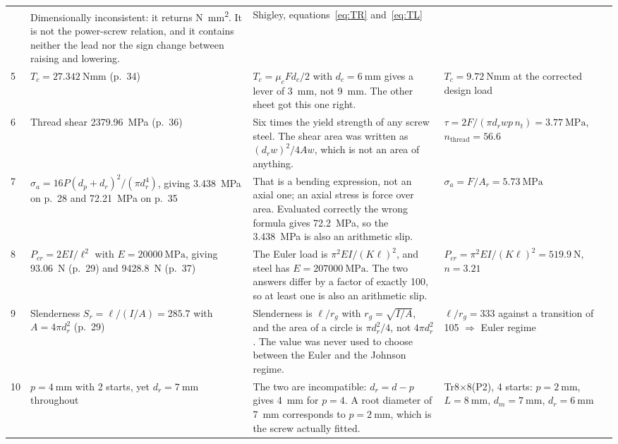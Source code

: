 \documentclass[11pt]{article}
\begin{document}
\begin{longtable}{@{}p{0.5cm}>{\raggedright\arraybackslash}p{3.9cm}>{\raggedright\arraybackslash}p{4.7cm}>{\raggedright\arraybackslash}p{4.9cm}@{}}
  & Dimensionally inconsistent: it returns \si{\newton\milli\metre\squared}. It is not the
    power-screw relation, and it contains neither the lead nor the sign change between
    raising and lowering.
  & Shigley, equations~\eqref{eq:TR} and~\eqref{eq:TL} \\
5 & $T_c = \SI{27.342}{\newton\milli\metre}$ (p.~34)
  & $T_c=\mu_c F d_c/2$ with $d_c=\SI{6}{\milli\metre}$ gives a lever of
    \SI{3}{\milli\metre}, not \SI{9}{\milli\metre}. The other sheet got this one right.
  & $T_c = \SI{9.72}{\newton\milli\metre}$ at the corrected design load \\
6 & Thread shear \SI{2379.96}{\mega\pascal} (p.~36)
  & Six times the yield strength of any screw steel. The shear area was written as
    $(d_r w)^2/4A w$, which is not an area of anything.
  & $\tau=2F/(\pi d_r w p\,n_t)=\SI{3.77}{\mega\pascal}$, $n_{\text{thread}}=56.6$ \\
7 & $\sigma_a = 16 P (d_p+d_r)^2/(\pi d_r^4)$, giving \SI{3.438}{\mega\pascal} on p.~28
    and \SI{72.21}{\mega\pascal} on p.~35
  & That is a bending expression, not an axial one; an axial stress is force over area.
    Evaluated correctly the wrong formula gives \SI{72.2}{\mega\pascal}, so the
    \SI{3.438}{\mega\pascal} is also an arithmetic slip.
  & $\sigma_a=F/A_r=\SI{5.73}{\mega\pascal}$ \\
8 & $P_{cr}=2EI/\ell^2$ with $E=\SI{20000}{\mega\pascal}$, giving \SI{93.06}{\newton}
    (p.~29) and \SI{9428.8}{\newton} (p.~37)
  & The Euler load is $\pi^2EI/(K\ell)^2$, and steel has $E=\SI{207000}{\mega\pascal}$.
    The two answers differ by a factor of exactly 100, so at least one is also an
    arithmetic slip.
  & $P_{cr}=\pi^2EI/(K\ell)^2=\SI{519.9}{\newton}$, $n=3.21$ \\
9 & Slenderness $S_r=\ell/(I/A)=285.7$ with $A=4\pi d_r^2$ (p.~29)
  & Slenderness is $\ell/r_g$ with $r_g=\sqrt{I/A}$, and the area of a circle is
    $\pi d_r^2/4$, not $4\pi d_r^2$. The value was never used to choose between the Euler
    and the Johnson regime.
  & $\ell/r_g=333$ against a transition of 105 $\Rightarrow$ Euler regime \\
10 & $p=\SI{4}{\milli\metre}$ with 2 starts, yet $d_r=\SI{7}{\milli\metre}$ throughout
   & The two are incompatible: $d_r=d-p$ gives \SI{4}{\milli\metre} for $p=4$. A root
     diameter of \SI{7}{\milli\metre} corresponds to $p=\SI{2}{\milli\metre}$, which is
     the screw actually fitted.
   & Tr8$\times$8(P2), 4 starts: $p=\SI{2}{\milli\metre}$, $L=\SI{8}{\milli\metre}$,
     $d_m=\SI{7}{\milli\metre}$, $d_r=\SI{6}{\milli\metre}$ \\

\end{longtable}
\end{document}
